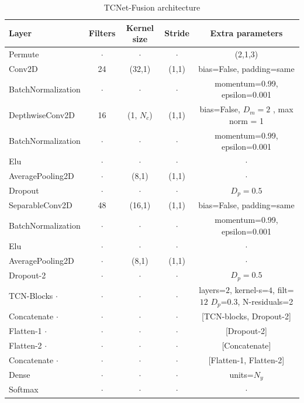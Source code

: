 \begin{table}[h!]
\caption{TCNet-Fusion architecture}\label{table:tcfnet}
\centering
\begin{tabular}{l|c|c|c|c}
\hline
\textbf{Layer} & \textbf{Filters} & \textbf{Kernel size} & \textbf{Stride} & \textbf{Extra parameters}\\
\hline
Permute & $\cdot$ & $\cdot$ & $\cdot$ & (2,1,3)\\
Conv2D & 24 & (32,1) & (1,1) & bias=False, padding=same \\
BatchNormalization & $\cdot$ & $\cdot$ & $\cdot$ & momentum=0.99, epsilon=0.001\\ 
\hline
DepthwiseConv2D & 16 & (1, $N_c$) & (1,1) & bias=False, $D_m= 2$ , max norm = 1  \\ 
BatchNormalization & $\cdot$ & $\cdot$ & $\cdot$ & momentum=0.99, epsilon=0.001\\ 
Elu & $\cdot$ & $\cdot$ & $\cdot$ & $\cdot$\\ 
AveragePooling2D & $\cdot$ & (8,1) & (1,1) & $\cdot$ \\ 
Dropout & $\cdot$ & $\cdot$ & $\cdot$ & $D_p = 0.5$\\
\hline
SeparableConv2D & 48 & (16,1) & (1,1) & bias=False, padding=same\\
BatchNormalization & $\cdot$ & $\cdot$ & $\cdot$ & momentum=0.99, epsilon=0.001\\
Elu & $\cdot$ & $\cdot$ & $\cdot$& $\cdot$\\
AveragePooling2D & $\cdot$ &(8,1) & (1,1)& $\cdot$\\
Dropout-2 & $\cdot$ & $\cdot$ & $\cdot$ & $D_p = 0.5$\\
\hline
TCN-Blocks $\cdot$ & $\cdot$ & $\cdot$ & $\cdot$ & layers=$2$, kernel-s=$4$, filt=$12$ $D_p$=$0.3$, N-residuals=2 \\
Concatenate $\cdot$ & $\cdot$ & $\cdot$ & $\cdot$ & [TCN-blocks, Dropout-2] \\
\hline
Flatten-1 $\cdot$ & $\cdot$ & $\cdot$ & $\cdot$ & [Dropout-2] \\
Flatten-2 $\cdot$ & $\cdot$ & $\cdot$ & $\cdot$ &  [Concatenate] \\
Concatenate $\cdot$ & $\cdot$ & $\cdot$ & $\cdot$ & [Flatten-1, Flatten-2] \\
\hline
Dense & $\cdot$ & $\cdot$ & $\cdot$ & units=$N_y$\\
Softmax & $\cdot$ & $\cdot$ & $\cdot$ & $\cdot$\\
\hline
\end{tabular}
\end{table}

